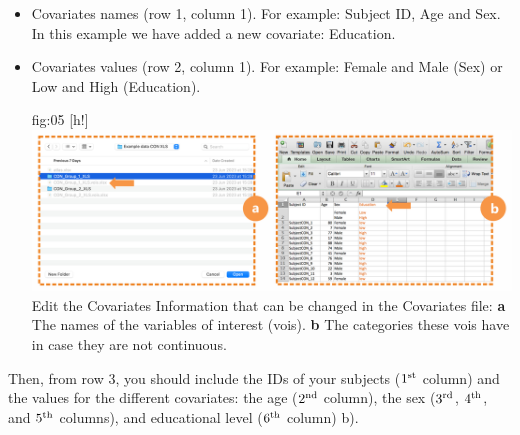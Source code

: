 \documentclass[justified]{tufte-handout}
\begin{document}
\begin{itemize}

\item Covariates names (row 1, column 1). 
For example: Subject ID, Age and Sex. In this example we have added a new covariate: Education.

\item Covariates values (row 2, column 1). 
For example: Female and Male (Sex) or Low and High (Education).

	{fig:05}
	{
	[h!]
	\includegraphics{fig05.png}
	}
	{Edit the Covariates}
	{
	Information that can be changed in the Covariates file: 
	{\bf a} The names of the variables of interest (vois).
	{\bf b} The categories these vois have in case they are not continuous.
	}


\end{itemize}
Then, from row 3, you should include the IDs of your subjects ($1^{\rm st}$ column) and the values for the different covariates: the age ($2^{\rm nd}$ column), the sex ($3^{\rm rd}$, $4^{\rm th}$, and $5^{\rm th}$ columns), and educational level ($6^{\rm th}$ column) b).	
\end{document}
